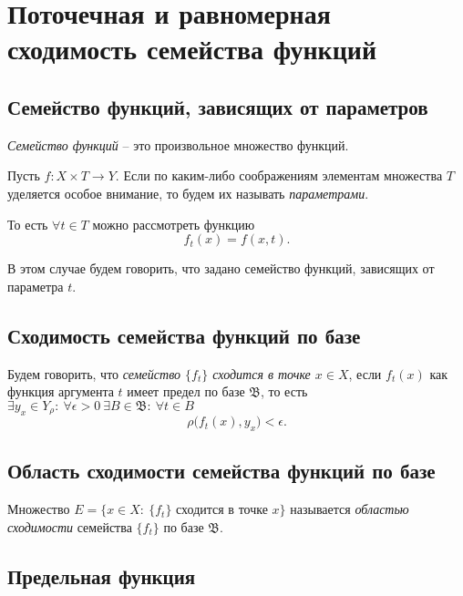 \section{Поточечная и равномерная сходимость семейства функций}

\setcounter{subsection}{66}

\subsection{Семейство функций, зависящих от параметров}

\begin{definition}
    \emph{Семейство функций} -- это произвольное множество функций.

    Пусть $f:X\times T \rightarrow Y$. Если по каким-либо соображениям элементам множества $T$ уделяется особое внимание, то будем их называть \emph{параметрами}.

    То есть $\forall t \in T$ можно рассмотреть функцию
    \[
        f_t(x) = f(x,t).
    \]

    В этом случае будем говорить, что задано семейство функций, зависящих от параметра $t$.
\end{definition}

\subsection{Сходимость семейства функций по базе}

\begin{definition}
    Будем говорить, что \emph{семейство $\{f_t\}$ сходится в точке $x \in X$}, если $f_t(x)$ как функция аргумента $t$ имеет предел по базе $\mathfrak{B}$, то есть $\exists y_x \in Y_\rho: \ \forall \epsilon > 0 \ \exists B \in \mathfrak{B}: \ \forall t \in B$
    \[
        \rho\big(f_t(x),y_x\big) < \epsilon.
    \]
\end{definition}

\subsection{Область сходимости семейства функций по базе}

\begin{definition}
    Множество $E = \big\{x \in X : \ \{f_t\}$ сходится в точке $x\big\}$ называется \emph{областью сходимости} семейства $\{f_t\}$ по базе $\mathfrak{B}$.
\end{definition}

\subsection{Предельная функция}

